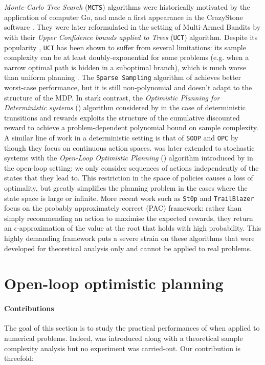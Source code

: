 \emph{Monte-Carlo Tree Search} (\texttt{MCTS}) algorithms were historically motivated by the application of computer Go, and made a first appearance in the CrazyStone software \citet{Coulom2006}. They were later reformulated in the setting of Multi-Armed Bandits by \citet{Kocsis2006} with their \emph{Upper Confidence bounds applied to Trees} (\texttt{UCT}) algorithm. Despite its popularity \citep{Silver2016,Silver2017,Silver2018}, \texttt{UCT} has been shown to suffer from several limitations: its sample complexity can be at least doubly-exponential for some problems (e.g. when a narrow optimal path is hidden in a suboptimal branch), which is much worse than uniform planning \citep{Coquelin2007}. The \texttt{Sparse Sampling} algorithm of \citet{Kearns2002} achieves better worst-case performance, but it is still non-polynomial and doesn't adapt to the structure of the MDP. In stark contrast, the \emph{Optimistic Planning for Deterministic systems} (\OPD) algorithm considered by \citet{Hren2008} in the case of deterministic transitions and rewards exploits the structure of the cumulative discounted reward to achieve a problem-dependent polynomial bound on sample complexity. A similar line of work in a deterministic setting is that of \texttt{SOOP} and \texttt{OPC} by \cite{Busoniu2013,Busoniu2018} though they focus on continuous action spaces. \OPD was later extended to stochastic systems with the \emph{Open-Loop Optimistic Planning} (\OLOP) algorithm introduced by \citet{Bubeck2010} in the open-loop setting: we only consider sequences of actions independently of the states that they lead to. This restriction in the space of policies causes a loss of optimality, but greatly simplifies the planning problem in the cases where the state space is large or infinite. More recent work such as \texttt{St0p} \citep{Szorenyi2014} and \texttt{TrailBlazer} \citep{Grill2016} focus on the probably approximately correct (PAC) framework: rather than simply recommending an action to maximise the expected rewards, they return an $\epsilon$-approximation of the value at the root that holds with high probability. This highly demanding framework puts a severe strain on these algorithms that were developed for theoretical analysis only and cannot be applied to real problems.

\section{Open-loop optimistic planning}

\paragraph{Contributions} The goal of this section is to study the practical performances of \OLOP when applied to numerical problems. Indeed, \OLOP was introduced along with a theoretical sample complexity analysis but no experiment was carried-out. Our contribution is threefold:

